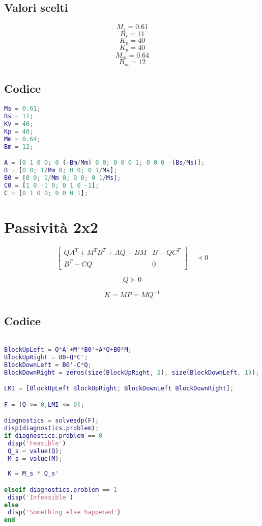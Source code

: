 \documentclass{article}
\begin{document}
\subsection{Valori scelti}

$$M_{s} = 0.61$$
$$B_{s} = 11$$
$$K_{v} = 40$$
$$K_{p} = 40$$
$$M_{m} = 0.64$$
$$B_{m} = 12$$


\subsection{Codice}

\begin{lstlisting}[language=Matlab]  % Start your code-block
Ms = 0.61;
Bs = 11;
Kv = 40;
Kp = 40;
Mm = 0.64;
Bm = 12;

A = [0 1 0 0; 0 (-Bm/Mm) 0 0; 0 0 0 1; 0 0 0 -(Bs/Ms)];
B = [0 0; 1/Mm 0; 0 0; 0 1/Ms];
B0 = [0 0; 1/Mm 0; 0 0; 0 1/Ms];
C0 = [1 0 -1 0; 0 1 0 -1];
C = [0 1 0 0; 0 0 0 1];
\end{lstlisting}


\section{Passività 2x2}

\begin{equation}
%
\begin{bmatrix} QA^{T} + M^{T}B^{T}+AQ+BM & B-QC^{T} \\ B^{T}-CQ & 0
\end{bmatrix}\quad \prec 0
%
\end{equation}

\begin{equation}
%
Q \succ 0
%
\end{equation}

$$K = MP = MQ^{-1}$$


\subsection{Codice}


\begin{lstlisting}[language=Matlab]  % Start your code-block

BlockUpLeft = Q*A'+M'*B0'+A*Q+B0*M;
BlockUpRight = B0-Q*C';
BlockDownLeft = B0'-C*Q;
BlockDownRight = zeros(size(BlockUpRight, 2), size(BlockDownLeft, 1));

LMI = [BlockUpLeft BlockUpRight; BlockDownLeft BlockDownRight];

F = [Q >= 0,LMI <= 0];

diagnostics = solvesdp(F);
disp(diagnostics.problem);
if diagnostics.problem == 0
 disp('Feasible')
 Q_s = value(Q);
 M_s = value(M);
 
 K = M_s * Q_s'

elseif diagnostics.problem == 1
 disp('Infeasible')
else
 disp('Something else happened')
end
\end{lstlisting}
\end{document}
